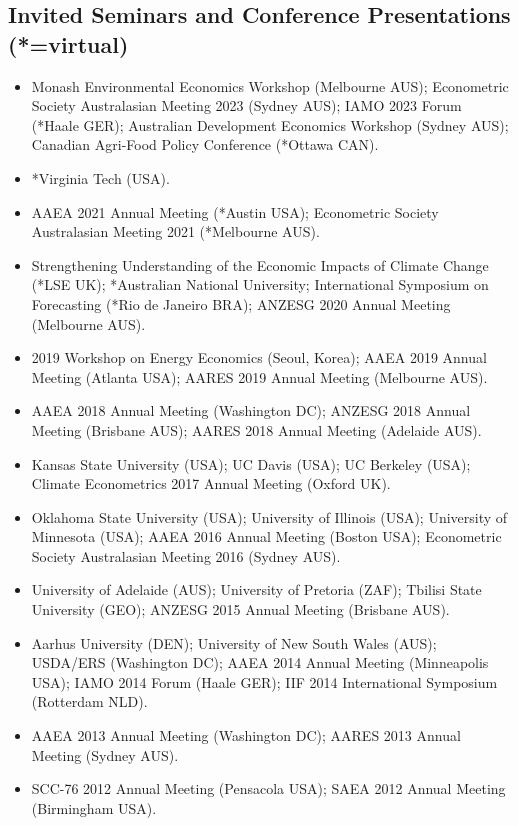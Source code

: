 \documentclass[10pt]{article}
\begin{document}
	\subsection*{Invited Seminars and Conference Presentations (*=virtual)}
	\begin{itemize}
		\item {} Monash Environmental Economics Workshop (Melbourne AUS); Econometric Society Australasian Meeting 2023 (Sydney AUS); IAMO 2023 Forum (*Haale GER); Australian Development Economics Workshop (Sydney AUS); Canadian Agri-Food Policy Conference (*Ottawa CAN).
		\item {} *Virginia Tech (USA).
		\item {} AAEA 2021 Annual Meeting (*Austin USA); Econometric Society Australasian Meeting 2021 (*Melbourne AUS).
		\item {} Strengthening Understanding of the Economic Impacts of Climate Change (*LSE UK); *Australian National University; International Symposium on Forecasting (*Rio de Janeiro BRA); ANZESG 2020 Annual Meeting (Melbourne AUS).
		\item {} 2019 Workshop on Energy Economics (Seoul, Korea); AAEA 2019 Annual Meeting (Atlanta USA); AARES 2019 Annual Meeting (Melbourne AUS).
		\item {} AAEA 2018 Annual Meeting (Washington DC); ANZESG 2018 Annual Meeting (Brisbane AUS); AARES 2018 Annual Meeting (Adelaide AUS).
		\item {} Kansas State University (USA); UC Davis (USA); UC Berkeley (USA); Climate Econometrics 2017 Annual Meeting (Oxford UK).
		\item {} Oklahoma State University (USA); University of Illinois (USA); University of Minnesota (USA); AAEA 2016 Annual Meeting (Boston USA); Econometric Society Australasian Meeting 2016 (Sydney AUS).
		\item {} University of Adelaide (AUS); University of Pretoria (ZAF); Tbilisi State University (GEO); ANZESG 2015 Annual Meeting (Brisbane AUS).
		\item {} Aarhus University (DEN); University of New South Wales (AUS); USDA/ERS (Washington DC); AAEA 2014 Annual Meeting (Minneapolis USA); IAMO 2014 Forum (Haale GER); IIF 2014 International Symposium (Rotterdam NLD).
		\item {} AAEA 2013 Annual Meeting (Washington DC); AARES 2013 Annual Meeting (Sydney AUS).
		\item {} SCC-76 2012 Annual Meeting (Pensacola USA); SAEA 2012 Annual Meeting (Birmingham USA).
	\end{itemize}
	
\end{document}
